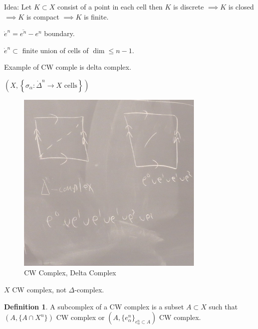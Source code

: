 \documentclass{article}
\theoremstyle{definition}
\newtheorem*{definition}{Definition}
\begin{document}
    Idea: Let \(K \subset X\) consist of a point in each cell then \(K\) is discrete \(\implies K\) is closed \(\implies K\) is compact \(\implies K\) is finite.

    \(\dot{e}^n = \overline{e^n} - e^n\) boundary.

    \(\dot{e}^n \subset\) finite union of cells of \(\dim \leq n-1\).

    Example of CW comple is delta complex.

    \(\left( X, \left\{ \sigma_\alpha: \mathring{\Delta}^n \to X  \text{ cells} \right\}  \right) \) 

    \begin{figure}[H]
        \centering
        \includegraphics[width=0.8\textwidth]{img/cwdelta}
        \caption{CW Complex, Delta Complex}
        \label{fig:cwdelta}
    \end{figure}    

    \begin{center}
    \end{center}

    \(X\) CW complex, not \(\Delta\)-complex.

    \begin{definition}
        A subcomplex of a CW complex is a subset \(A \subset X\) such that \((A,\{ A\cap X^n \} )\) CW complex or \(\left( A, \{ e^n_\alpha \}_{e^n_\alpha \subset A} \right)\) CW complex.
    \end{definition}
\end{document}
